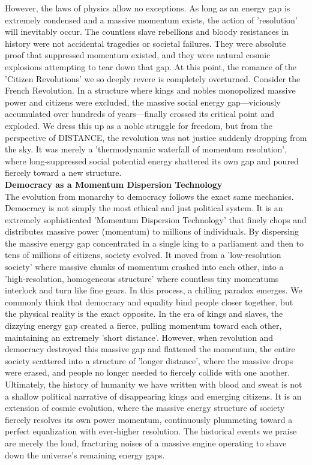 However, the laws of physics allow no exceptions. As long as an energy gap is extremely condensed and a massive momentum exists, the action of 'resolution' will inevitably occur. The countless slave rebellions and bloody resistances in history were not accidental tragedies or societal failures. They were absolute proof that suppressed momentum existed, and they were natural cosmic explosions attempting to tear down that gap.
At this point, the romance of the 'Citizen Revolutions' we so deeply revere is completely overturned. Consider the French Revolution. In a structure where kings and nobles monopolized massive power and citizens were excluded, the massive social energy gap—viciously accumulated over hundreds of years—finally crossed its critical point and exploded. We dress this up as a noble struggle for freedom, but from the perspective of DISTANCE, the revolution was not justice suddenly dropping from the sky. It was merely a 'thermodynamic waterfall of momentum resolution', where long-suppressed social potential energy shattered its own gap and poured fiercely toward a new structure. \\
\textbf{Democracy as a Momentum Dispersion Technology} \\
The evolution from monarchy to democracy follows the exact same mechanics. Democracy is not simply the most ethical and just political system. It is an extremely sophisticated 'Momentum Dispersion Technology' that finely chops and distributes massive power (momentum) to millions of individuals.
By dispersing the massive energy gap concentrated in a single king to a parliament and then to tens of millions of citizens, society evolved. It moved from a 'low-resolution society' where massive chunks of momentum crashed into each other, into a 'high-resolution, homogeneous structure' where countless tiny momentums interlock and turn like fine gears.
In this process, a chilling paradox emerges. We commonly think that democracy and equality bind people closer together, but the physical reality is the exact opposite. In the era of kings and slaves, the dizzying energy gap created a fierce, pulling momentum toward each other, maintaining an extremely 'short distance'. However, when revolution and democracy destroyed this massive gap and flattened the momentum, the entire society scattered into a structure of 'longer distance', where the massive drops were erased, and people no longer needed to fiercely collide with one another.
Ultimately, the history of humanity we have written with blood and sweat is not a shallow political narrative of disappearing kings and emerging citizens. It is an extension of cosmic evolution, where the massive energy structure of society fiercely resolves its own power momentum, continuously plummeting toward a perfect equalization with ever-higher resolution. The historical events we praise are merely the loud, fracturing noises of a massive engine operating to shave down the universe's remaining energy gaps.
